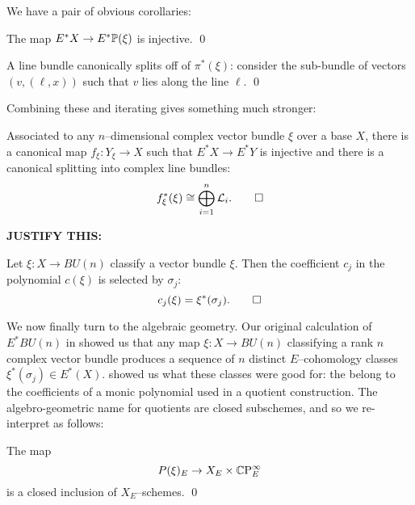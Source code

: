 We have a pair of obvious corollaries:
\begin{corollary}
The map $E^* X \to E^* \P(\xi)$ is injective. \qed
\end{corollary}
\begin{corollary}
A line bundle canonically splits off of $\pi^*(\xi)$: consider the sub-bundle of vectors $(v, (\ell, x))$ such that $v$ lies along the line $\ell$. \qed
\end{corollary}

\noindent Combining these and iterating gives something much stronger:

\begin{corollary}
Associated to any $n$--dimensional complex vector bundle $\xi$ over a base $X$, there is a canonical map $f_\xi: Y_\xi \to X$ such that $E^* X \to E^* Y$ is injective and there is a canonical splitting into complex line bundles: \[f_\xi^*(\xi) \cong \bigoplus_{i=1}^n \L_i. \qed\]
\end{corollary}

\textbf{JUSTIFY THIS:}
\begin{theorem}
Let $\xi: X \to BU(n)$ classify a vector bundle $\xi$.  Then the coefficient $c_j$ in the polynomial $c(\xi)$ is selected by $\sigma_j$: \[c_j(\xi) = \xi^*(\sigma_j). \qed\]
\end{theorem}


We now finally turn to the algebraic geometry.  Our original calculation of $E^* BU(n)$ in  showed us that any map $\xi: X \to BU(n)$ classifying a rank $n$ complex vector bundle produces a sequence of $n$ distinct $E$--cohomology classes $\xi^*(\sigma_j) \in E^*(X)$.   showed us what these classes were good for: the belong to the coefficients of a monic polynomial used in a quotient construction.  The algebro-geometric name for quotients are closed subschemes, and so we re-interpret  as follows:
\begin{corollary}
The map \[P(\xi)_E \to X_E \times \CP^\infty_E\] is a closed inclusion of $X_E$--schemes. \qed
\end{corollary}

